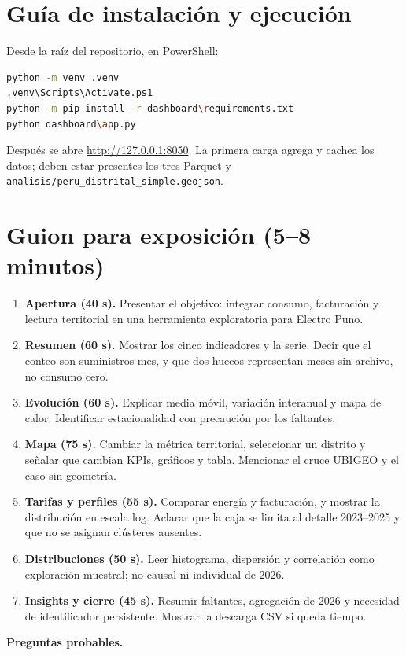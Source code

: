\documentclass[11pt,a4paper]{article}
\begin{document}
\section{Guía de instalación y ejecución}
Desde la raíz del repositorio, en PowerShell:
\begin{lstlisting}[language=bash,caption={Instalación local en Windows}]
python -m venv .venv
.venv\Scripts\Activate.ps1
python -m pip install -r dashboard\requirements.txt
python dashboard\app.py
\end{lstlisting}
Después se abre \url{http://127.0.0.1:8050}. La primera carga agrega y cachea los datos; deben estar presentes los tres Parquet y \texttt{analisis/peru\_distrital\_simple.geojson}.

\section{Guion para exposición (5--8 minutos)}
\begin{enumerate}
\item \textbf{Apertura (40 s).} Presentar el objetivo: integrar consumo, facturación y lectura territorial en una herramienta exploratoria para Electro Puno.
\item \textbf{Resumen (60 s).} Mostrar los cinco indicadores y la serie. Decir que el conteo son suministros-mes, y que dos huecos representan meses sin archivo, no consumo cero.
\item \textbf{Evolución (60 s).} Explicar media móvil, variación interanual y mapa de calor. Identificar estacionalidad con precaución por los faltantes.
\item \textbf{Mapa (75 s).} Cambiar la métrica territorial, seleccionar un distrito y señalar que cambian KPIs, gráficos y tabla. Mencionar el cruce UBIGEO y el caso sin geometría.
\item \textbf{Tarifas y perfiles (55 s).} Comparar energía y facturación, y mostrar la distribución en escala log. Aclarar que la caja se limita al detalle 2023--2025 y que no se asignan clústeres ausentes.
\item \textbf{Distribuciones (50 s).} Leer histograma, dispersión y correlación como exploración muestral; no causal ni individual de 2026.
\item \textbf{Insights y cierre (45 s).} Resumir faltantes, agregación de 2026 y necesidad de identificador persistente. Mostrar la descarga CSV si queda tiempo.
\end{enumerate}
\textbf{Preguntas probables.}
\end{document}

